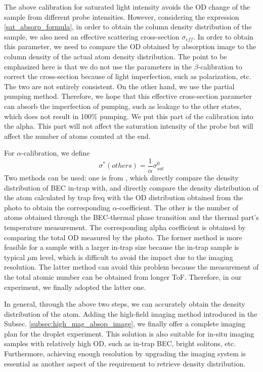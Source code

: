 The above calibration for saturated light intensity avoids the OD change of the sample from different probe intensities. However, considering the expression \ref{sat_absorp_formula}, in order to obtain the column density distribution of the sample, we also need an effective scattering cross-section $\sigma_{eff}$. In order to obtain this parameter, we need to compare the OD obtained by absorption image to the column density of the actual atom density distribution. The point to be emphasized here is that we do not use the parameters in the $\beta$-calibration to correct the cross-section because of light imperfection, such as polarization, etc. The two are not entirely consistent. On the other hand, we use the partial pumping method. Therefore, we hope that this effective cross-section parameter can absorb the imperfection of pumping, such as leakage to the other states, which does not result in 100\% pumping. We put this part of the calibration into the alpha. This part will not affect the saturation intensity of the probe but will affect the number of atoms counted at the end.

For $\alpha$-calibration, we define
\begin{equation}
\sigma^*(others)=\frac{1}{\alpha} \sigma^0_{sat}
\end{equation}
Two methods can be used: one is from \cite{hung2011situ}, which directly compare the density distribution of BEC in-trap with, and directly compare the density distribution of the atom calculated by trap freq with the OD distribution obtained from the photo to obtain the corresponding $\alpha$-coefficient. The other is the number of atoms obtained through the BEC-thermal phase transition and the thermal part's temperature measurement. The corresponding alpha coefficient is obtained by comparing the total OD measured by the photo. The former method is more feasible for a sample with a larger in-trap size because the in-trap sample is typical $\mu$m level, which is difficult to avoid the impact due to the imaging resolution. The latter method can avoid this problem because the measurement of the total atomic number can be obtained from longer ToF. Therefore, in our experiment, we finally adopted the latter one.


In general, through the above two steps, we can accurately obtain the density distribution of the atom. Adding the high-field imaging method introduced in the Subsec. \ref{subsec:high_mag_absop_image}, we finally offer a complete imaging plan for the droplet experiment. This solution is also suitable for in-situ imaging samples with relatively high OD, such as in-trap BEC, bright solitons, etc. Furthermore, achieving enough resolution by upgrading the imaging system is essential as another aspect of the requirement to retrieve density distribution.

